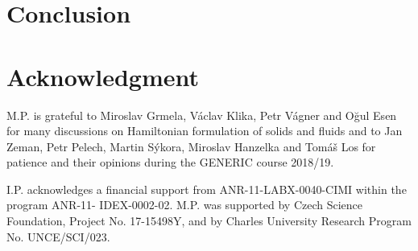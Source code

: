 \documentclass[
10pt, %
a4paper, %
oneside, %
headinclude,footinclude, %
BCOR5mm, %
]{scrartcl}
\begin{document}
\section{Conclusion}

\section*{Acknowledgment}
M.P. is grateful to Miroslav Grmela, Václav Klika, Petr Vágner and O{\u g}ul Esen for many discussions on Hamiltonian formulation of solids and fluids and to Jan Zeman, Petr Pelech, Martin Sýkora, Miroslav Hanzelka and Tomáš Los for patience and their opinions during the GENERIC course 2018/19.

I.P. acknowledges a financial support from ANR-11-LABX-0040-CIMI within the program ANR-11-
IDEX-0002-02. M.P. was supported by Czech Science Foundation, Project No. 17-15498Y, and by Charles University Research Program No. UNCE/SCI/023. 


\renewcommand{\refname}{\spacedlowsmallcaps{References}} %





\appendix
\end{document}
